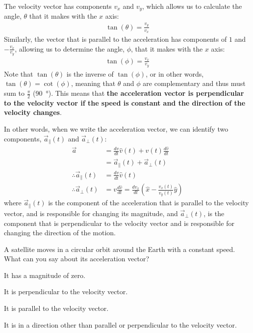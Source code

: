 The velocity vector has components $v_x$ and $v_y$, which allows us to calculate the angle, $\theta$ that it makes with the $x$ axis:
\begin{align*}
\tan(\theta)=\frac{v_y}{v_x}
\end{align*}
Similarly, the vector that is parallel to the acceleration has components of $1$ and $-\frac{v_x}{v_y}$, allowing us to determine the angle, $\phi$, that it makes with the $x$ axis:
\begin{align*}
\tan(\phi)=\frac{v_x}{v_y}
\end{align*}
Note that $\tan(\theta)$ is the inverse of $\tan(\phi)$, or in other words, $\tan(\theta)=\cot(\phi)$, meaning that $\theta$ and $\phi$ are complementary and thus must sum to $\frac{\pi}{2}$ (\SI{90}{\degree}). This means that \textbf{the acceleration vector is perpendicular to the velocity vector if the speed is constant and the direction of the velocity changes}. 

In other words, when we write the acceleration vector, we can identify two components, $\vec a_{\parallel}(t)$ and $\vec a_{\perp}(t)$:
\begin{align*}
\vec a&=\frac{dv}{dt}\hat v(t)+v(t)\frac{d\hat v}{dt}\\
&=\vec a_{\parallel}(t) + \vec a_{\perp}(t)\\
\therefore \vec a_{\parallel}(t)&=\frac{dv}{dt}\hat v(t)\\
\therefore \vec a_{\perp}(t)&=v\frac{d\hat v}{dt}=\frac{dv_x}{dt} \left(\hat x - \frac{v_x(t)}{v_y(t)}\hat y\right)
\end{align*}
where $\vec a_{\parallel}(t)$ is the component of the acceleration that is parallel to the velocity vector, and is responsible for changing its magnitude, and $\vec a_{\perp}(t)$, is the component that is perpendicular to the velocity vector and is responsible for changing the direction of the motion.

\begin{checkpoint}{\begin{MCquestion}{A satellite moves in a circular orbit around the Earth with a constant speed. What can you say about its acceleration vector?}
\item It has a magnitude of zero.
\item It is perpendicular to the velocity vector. \correct
\item It is parallel to the velocity vector.
\item It is in a direction other than parallel or perpendicular to the velocity vector.
\end{MCquestion}}
\end{checkpoint}

